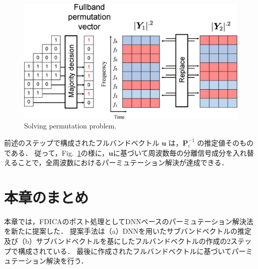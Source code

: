 \begin{figure}[!t]
    \begin{center}
        \includegraphics[width=0.9\columnwidth]{figures/solve_pp.eps}
    \end{center}
    \vspace{-15pt}
	\caption{Solving permutation problem.}
	\label{fig:solve_pp}
	\vspace{-8pt}   %
\end{figure}
前述のステップで構成されたフルバンドベクトル $\bm{u}$ は，$\bm{P}_i^{-1}$ の推定値そのものである．
従って，Fig.~\ref{fig:solve_pp}の様に，$\bm{u}$に基づいて周波数毎の分離信号成分を入れ替えることで，全周波数におけるパーミュテーション解決が達成できる．

\section{本章のまとめ}
\label{sec:3matome}
本章では，FDICAのポスト処理としてDNNベースのパーミュテーション解決法を新たに提案した．
提案手法は（a）DNNを用いたサブバンドベクトルの推定及び（b）サブバンドベクトルを基にしたフルバンドベクトルの作成の2ステップで構成されている．
最後に作成されたフルバンドベクトルに基づいてパーミュテーション解決を行う．